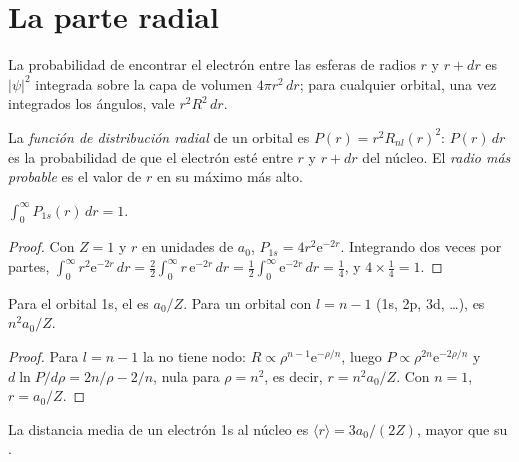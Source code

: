 \section{La parte radial}

La probabilidad de encontrar el electrón entre las esferas de radios $r$ y $r +
dr$ es $|\psi|^2$ integrada sobre la capa de volumen $4\pi r^2\,dr$; para cualquier
orbital, una vez integrados los ángulos, vale $r^2R^2\,dr$.

\begin{definition}\label{def:b2:atomic-orbitals:radial-distribution}
La \emph{función de distribución radial} de
un orbital es $P(r) = r^2R_{nl}(r)^2$: $P(r)\,dr$ es la probabilidad de que el
electrón esté entre $r$ y $r + dr$ del núcleo. El \emph{radio más
probable} es el valor de $r$ en su máximo más alto.
\end{definition}

\begin{proposition}[Normalización de 1s]\label{prop:b2:atomic-orbitals:normalised}
$\int_0^\infty P_{1s}(r)\,dr = 1$.
\end{proposition}

\begin{proof}
Con $Z = 1$ y $r$ en unidades de $a_0$, $P_{1s} = 4r^2\mathrm e^{-2r}$. Integrando dos veces por partes,
$\int_0^\infty r^2\mathrm e^{-2r}\,dr = \frac22\int_0^\infty r\,\mathrm e^{-2r}\,dr =
\frac12\int_0^\infty\mathrm e^{-2r}\,dr = \frac14$, y $4 \times \frac14 = 1$.
\end{proof}

\begin{proposition}\label{prop:b2:atomic-orbitals:most-probable}
Para el orbital 1s, el  es $a_0/Z$. Para un orbital con $l =
n - 1$ (1s, 2p, 3d, \dots), es $n^2a_0/Z$.
\end{proposition}

\begin{proof}
Para $l = n - 1$ la  no tiene nodo: $R \propto \rho^{n-1}\mathrm e^{-\rho/n}$,
luego $P \propto \rho^{2n}\mathrm e^{-2\rho/n}$ y $d\ln P/d\rho = 2n/\rho - 2/n$, nula
para $\rho = n^2$, es decir, $r = n^2a_0/Z$. Con $n = 1$, $r = a_0/Z$.
\end{proof}

\begin{proposition}\label{prop:b2:atomic-orbitals:mean-radius}
La distancia media de un electrón 1s al núcleo es $\langle r\rangle = 3a_0/(2Z)$,
mayor que su .
\end{proposition}

